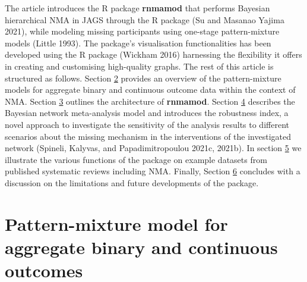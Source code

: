 The article introduces the R package \textbf{rnmamod} that performs Bayesian
hierarchical NMA in JAGS through the R package  (Su and Masanao Yajima 2021),
while modeling missing participants using one-stage pattern-mixture models (Little 1993).
The package's visualisation functionalities has been developed using the R package
 (Wickham 2016) harnessing the flexibility it offers in creating
and customising high-quality graphs. The rest of this article is structured as
follows. Section \protect\hyperlink{Pattern-mixture-models-for-aggregate-binary-and-continuous-outcomes}{2}
provides an overview of the pattern-mixture models for aggregate binary and continuous
outcome data within the context of NMA. Section \protect\hyperlink{The-architecture-of-ux2fpkgux5cux257Brnmamodux5cux257D}{3}
outlines the architecture of \textbf{rnmamod}. Section \protect\hyperlink{Bayesian-network-meta-analysis-model}{4}
describes the Bayesian network meta-analysis model and introduces the robustness
index, a novel approach to investigate the sensitivity of the analysis results to
different scenarios about the missing mechanism in the interventions of the investigated
network (Spineli, Kalyvas, and Papadimitropoulou 2021c, 2021b).
In section \protect\hyperlink{X}{5} we illustrate the various functions of the package on example
datasets from published systematic reviews including NMA. Finally, Section \protect\hyperlink{X}{6}
concludes with a discussion on the limitations and future developments of the package.

\hypertarget{pattern-mixture-model-for-aggregate-binary-and-continuous-outcomes}{%
\section{Pattern-mixture model for aggregate binary and continuous outcomes}\label{pattern-mixture-model-for-aggregate-binary-and-continuous-outcomes}}

